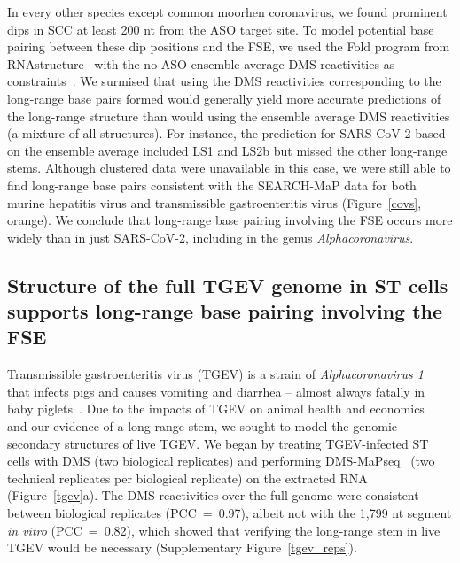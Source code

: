\documentclass[main.tex]{subfiles}
\begin{document}
In every other species except common moorhen coronavirus, we found prominent dips in SCC at least 200 nt from the ASO target site.
To model potential base pairing between these dip positions and the FSE, we used the Fold program from RNAstructure~\cite{Reuter2010} with the no-ASO ensemble average DMS reactivities as constraints~\cite{Cordero2012}.
We surmised that using the DMS reactivities corresponding to the long-range base pairs formed would generally yield more accurate predictions of the long-range structure than would using the ensemble average DMS reactivities (a mixture of all structures).
For instance, the prediction for SARS-CoV-2 based on the ensemble average included LS1 and LS2b but missed the other long-range stems.
Although clustered data were unavailable in this case, we were still able to find long-range base pairs consistent with the SEARCH-MaP data for both murine hepatitis virus and transmissible gastroenteritis virus (Figure~\ref{covs}, orange).
We conclude that long-range base pairing involving the FSE occurs more widely than in just SARS-CoV-2, including in the genus \textit{Alphacoronavirus}.

\subsection{Structure of the full TGEV genome in ST cells supports long-range base pairing involving the FSE}

Transmissible gastroenteritis virus (TGEV) is a strain of \textit{Alphacoronavirus 1}~\cite{Whittaker2018} that infects pigs and causes vomiting and diarrhea -- almost always fatally in baby piglets~\cite{Liu2021}.
Due to the impacts of TGEV on animal health and economics~\cite{Liu2021} and our evidence of a long-range stem, we sought to model the genomic secondary structures of live TGEV.
We began by treating TGEV-infected ST cells with DMS (two biological replicates) and performing DMS-MaPseq~\cite{Zubradt2016} (two technical replicates per biological replicate) on the extracted RNA (Figure~\ref{tgev}a).
The DMS reactivities over the full genome were consistent between biological replicates (PCC~=~0.97), albeit not with the 1,799 nt segment \textit{in vitro} (PCC~=~0.82), which showed that verifying the long-range stem in live TGEV would be necessary (Supplementary Figure~\ref{tgev_reps}).
\end{document}
